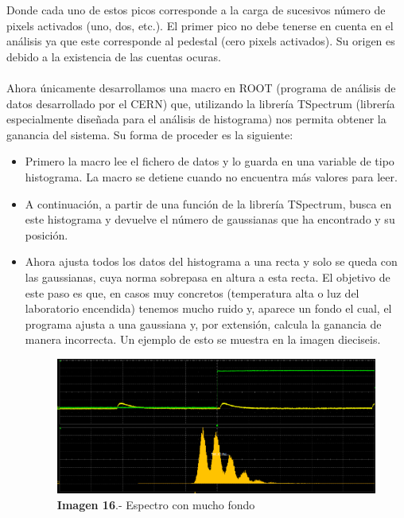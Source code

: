 Donde cada uno de estos picos corresponde a la carga de sucesivos número de pixels activados (uno, dos, etc.). El primer pico no debe tenerse en cuenta en el análisis ya que este corresponde al pedestal (cero pixels activados). Su origen es debido a la existencia de las cuentas ocuras.
 
\paragraph {}  
Ahora únicamente desarrollamos una macro en ROOT (programa de análisis de datos desarrollado por el CERN) que, utilizando la librería TSpectrum (librería especialmente diseñada para el análisis de histograma) nos permita obtener la ganancia del sistema. Su forma de proceder es la siguiente:
\begin{itemize}
\item {} Primero la macro lee el fichero de datos y lo guarda en una variable de tipo histograma. La macro se detiene cuando no encuentra más valores para leer.

\item {} A continuación, a partir de una función de la librería TSpectrum, busca en este histograma y devuelve el número de gaussianas que ha encontrado y su posición.

\item {} Ahora ajusta todos los datos del histograma a una recta y solo se queda con las gaussianas, cuya norma sobrepasa en altura a esta recta. El objetivo de este paso es que, en casos muy concretos (temperatura alta o luz del laboratorio encendida) tenemos mucho ruido y, aparece un fondo el cual, el programa ajusta a una gaussiana y, por extensión, calcula la ganancia de manera incorrecta. Un ejemplo de esto se muestra en la imagen dieciseis.

\begin{figure}[hbtp]
\centering
\includegraphics[scale=0.2]{fondogaussiano.png}
\caption{\textbf{Imagen 16}.- Espectro con mucho fondo}
\end{figure}


\end{itemize}
